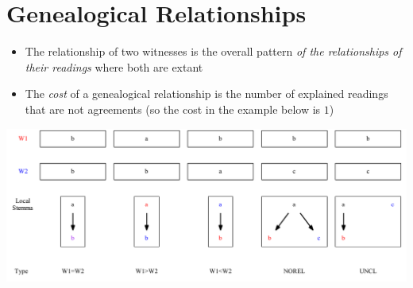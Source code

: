 \documentclass[10pt]{beamer}
\begin{document}
	\section*{Genealogical Relationships}
	\begin{frame}
		\begin{itemize}
			\item The relationship of two witnesses is the overall pattern \emph{of the relationships of their readings} where both are extant
			\item The \emph{cost} of a genealogical relationship is the number of explained readings that are not agreements (so the cost in the example below is $1$)
		\end{itemize}
		\begin{center}
			\includegraphics[width=\textwidth]{../img/genealogical-relationships.pdf}
		\end{center}
	\end{frame}
\end{document}

